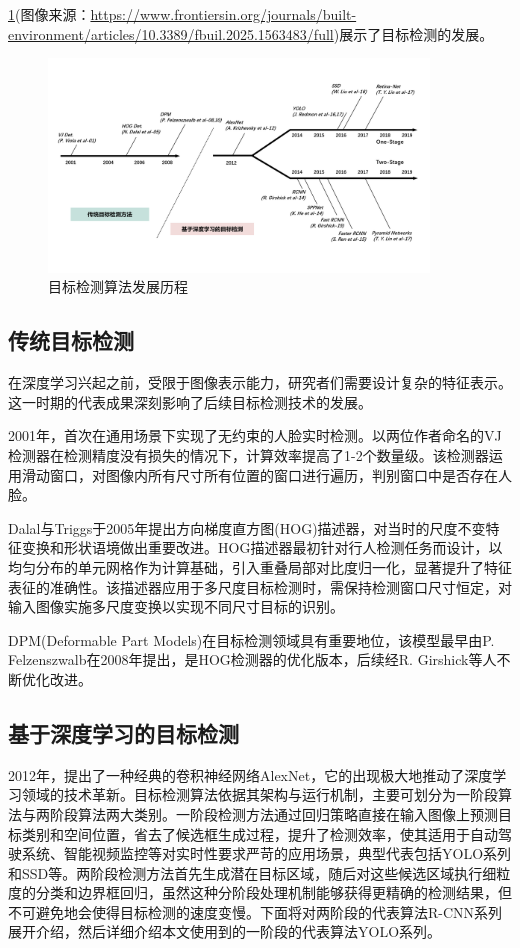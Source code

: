 \ref{fig:his}(图像来源：\url{https://www.frontiersin.org/journals/built-environment/articles/10.3389/fbuil.2025.1563483/full})展示了目标检测的发展。

\begin{figure}[!htb]
  \centering
  \includegraphics[width=0.9\textwidth]{figs/chap01/his.png}
  \caption{目标检测算法发展历程}
  \label{fig:his}
\end{figure}

\subsection{传统目标检测}
在深度学习兴起之前，受限于图像表示能力，研究者们需要设计复杂的特征表示。这一时期的代表成果深刻影响了后续目标检测技术的发展。

2001年，\textcite{Viola2001}首次在通用场景下实现了无约束的人脸实时检测。以两位作者命名的VJ检测器在检测精度没有损失的情况下，计算效率提高了1-2个数量级。该检测器运用滑动窗口，对图像内所有尺寸所有位置的窗口进行遍历，判别窗口中是否存在人脸。

Dalal与Triggs于2005年提出方向梯度直方图(HOG)描述器，对当时的尺度不变特征变换和形状语境做出重要改进\cite{Dalal2005}。HOG描述器最初针对行人检测任务而设计，以均匀分布的单元网格作为计算基础，引入重叠局部对比度归一化，显著提升了特征表征的准确性。该描述器应用于多尺度目标检测时，需保持检测窗口尺寸恒定，对输入图像实施多尺度变换以实现不同尺寸目标的识别。

DPM(Deformable Part Models)在目标检测领域具有重要地位，该模型最早由P. Felzenszwalb在2008年提出\cite{Felzenszwalb2008}，是HOG检测器的优化版本，后续经R. Girshick等人不断优化改进\cite{Felzenszwalb2010Cascade}。

\subsection{基于深度学习的目标检测}
2012年，\textcite{alexNet}提出了一种经典的卷积神经网络AlexNet，它的出现极大地推动了深度学习领域的技术革新。目标检测算法依据其架构与运行机制，主要可划分为一阶段算法与两阶段算法两大类别。一阶段检测方法通过回归策略直接在输入图像上预测目标类别和空间位置，省去了候选框生成过程，提升了检测效率，使其适用于自动驾驶系统、智能视频监控等对实时性要求严苛的应用场景，典型代表包括YOLO系列和SSD等。两阶段检测方法首先生成潜在目标区域，随后对这些候选区域执行细粒度的分类和边界框回归，虽然这种分阶段处理机制能够获得更精确的检测结果，但不可避免地会使得目标检测的速度变慢。下面将对两阶段的代表算法R-CNN系列展开介绍，然后详细介绍本文使用到的一阶段的代表算法YOLO系列。

